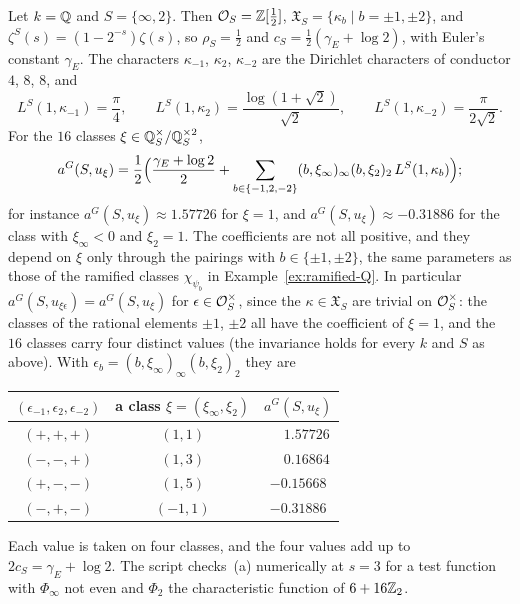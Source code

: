 \begin{example}\label{ex:unip-coeff}
Let $k=\mathbb{Q}$ and $S=\{\infty,2\}$. Then $\mathcal{O}_S=\mathbb{Z}[\frac12]$,
$\mathfrak X_S=\{\kappa_b\mid b=\pm1,\pm2\}$, and
$\zeta^S(s)=(1-2^{-s})\zeta(s)$, so $\rho_S=\frac12$ and
$c_S=\frac12(\gamma_E+\log2)$, with Euler's constant $\gamma_E$. The
characters $\kappa_{-1}$, $\kappa_2$, $\kappa_{-2}$ are the Dirichlet
characters of conductor $4$, $8$, $8$, and
\[
L^S(1,\kappa_{-1})=\frac\pi4,\qquad L^S(1,\kappa_2)=\frac{\log(1+\sqrt2)}
{\sqrt2},\qquad L^S(1,\kappa_{-2})=\frac\pi{2\sqrt2}.
\]
For the $16$ classes $\xi\in\mathbb{Q}_S^\times/\mathbb{Q}_S^{\times2}$,
\[
a^G(S,u_\xi)=\frac12\Bigl(\frac{\gamma_E+\log2}2+\sum_{b\in\{-1,2,-2\}}
(b,\xi_\infty)_\infty(b,\xi_2)_2\,L^S(1,\kappa_b)\Bigr);
\]
for instance $a^G(S,u_\xi)\approx1.57726$ for $\xi=1$, and
$a^G(S,u_\xi)\approx-0.31886$ for the class with $\xi_\infty<0$ and $\xi_2=1$.
The coefficients are not all positive, and they depend on $\xi$ only through
the pairings with $b\in\{\pm1,\pm2\}$, the same parameters as those of the
ramified classes $\chi_{\psi_b}$ in Example~\ref{ex:ramified-Q}. In
particular $a^G(S,u_{\xi\epsilon})=a^G(S,u_\xi)$ for $\epsilon\in\mathcal{O}_S^\times$,
since the $\kappa\in\mathfrak X_S$ are trivial on $\mathcal{O}_S^\times$: the
classes of the rational elements $\pm1$, $\pm2$ all have the coefficient of
$\xi=1$, and the $16$ classes carry four distinct values (the invariance
holds for every $k$ and $S$ as above). With $\epsilon_b=(b,\xi_\infty)_\infty
(b,\xi_2)_2$ they are
\begin{center}
\begin{tabular}{ccc}
$(\epsilon_{-1},\epsilon_2,\epsilon_{-2})$ & a class $\xi=(\xi_\infty,\xi_2)$ &
$a^G(S,u_\xi)$\\\hline
$(+,+,+)$ & $(1,1)$ & $\phantom{-}1.57726$\\
$(-,-,+)$ & $(1,3)$ & $\phantom{-}0.16864$\\
$(+,-,-)$ & $(1,5)$ & $-0.15668$\\
$(-,+,-)$ & $(-1,1)$ & $-0.31886$
\end{tabular}
\end{center}
Each value is taken on four classes, and the four values add up to
$2c_S=\gamma_E+\log2$. The
script checks~(a) numerically at $s=3$ for a test function with
$\Phi_\infty$ not even and $\Phi_2$ the characteristic function of
$6+16\mathbb{Z}_2$.
\end{example}

